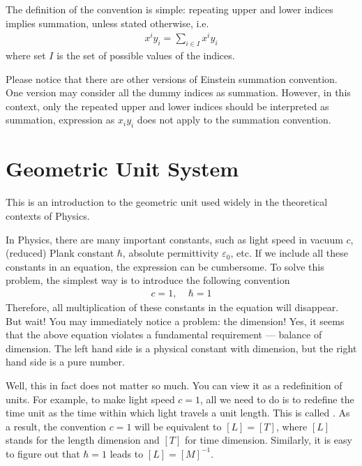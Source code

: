 \documentclass[letterpaper,10pt,english]{sphinxmanual}
\begin{document}
The definition of the convention is simple: repeating upper and lower indices implies summation, unless stated otherwise, i.e.
\begin{equation*}
\begin{split}x^iy_i = \sum_{i\in I}x^iy_i\end{split}
\end{equation*}
where set \(I\) is the set of possible values of the indices.

Please notice that there are other versions of Einstein summation convention. One version may consider all the dummy indices as summation. However, in this context, only the repeated upper and lower indices should be interpreted as summation, expression as \(x_iy_i\) does not apply to the summation convention.


\section{Geometric Unit System}
\label{\detokenize{bg_geo_unit:geometric-unit-system}}\label{\detokenize{bg_geo_unit::doc}}
This is an introduction to the geometric unit used widely in the theoretical contexts of Physics.

In Physics, there are many important constants, such as light speed in vacuum \(c\), (reduced) Plank constant \(\hbar\), absolute permittivity \(\varepsilon_0\), etc. If we include all these constants in an equation, the expression can be cumbersome. To solve this problem, the simplest way is to introduce the following convention
\begin{equation*}
\begin{split}c=1,\ \ \ \ \ \hbar=1\end{split}
\end{equation*}
Therefore, all multiplication of these constants in the equation will disappear. But wait! You may immediately notice a problem: the dimension! Yes, it seems that the above equation violates a fundamental requirement — balance of dimension. The left hand side is a physical constant with dimension, but the right hand side is a pure number.

Well, this in fact does not matter so much. You can view it as a redefinition of units. For example, to make light speed \(c=1\), all we need to do is to redefine the time unit as the time within which light travels a unit length. This is called . As a result, the convention \(c=1\) will be equivalent to \([L]=[T]\), where \([L]\) stands for the length dimension and \([T]\) for time dimension. Similarly, it is easy to figure out that \(\hbar=1\) leads to \([L]=[M]^{-1}\).
\end{document}
